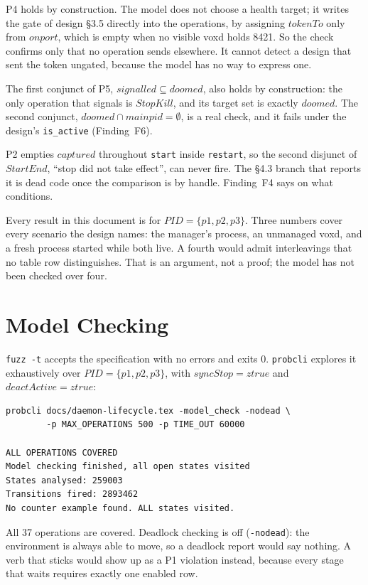 \documentclass[a4paper,10pt,fleqn]{article}
\begin{document}
P4 holds by construction. The model does not choose a health target; it
writes the gate of design \S3.5 directly into the operations, by assigning
$tokenTo$ only from $onport$, which is empty when no visible voxd holds
8421. So the check confirms only that no operation sends elsewhere. It
cannot detect a design that sent the token ungated, because the model has
no way to express one.

The first conjunct of P5, $signalled \subseteq doomed$, also holds by
construction: the only operation that signals is $StopKill$, and its target
set is exactly $doomed$. The second conjunct,
$doomed \cap mainpid = \emptyset$, is a real check, and it fails under the
design's \texttt{is\_active} (Finding~F6).

P2 empties $captured$ throughout \texttt{start} inside \texttt{restart}, so
the second disjunct of $StartEnd$, ``stop did not take effect'', can never
fire. The \S4.3 branch that reports it is dead code once the comparison is
by handle. Finding~F4 says on what conditions.

Every result in this document is for $PID = \{p1, p2, p3\}$. Three numbers
cover every scenario the design names: the manager's process, an unmanaged
voxd, and a fresh process started while both live. A fourth would admit
interleavings that no table row distinguishes. That is an argument, not a
proof; the model has not been checked over four.

\section{Model Checking}
\label{sec:modelcheck}

\texttt{fuzz -t} accepts the specification with no errors and exits 0.
\texttt{probcli} explores it exhaustively over $PID = \{p1, p2, p3\}$, with
$syncStop = ztrue$ and $deactActive = ztrue$:

\begin{verbatim}
probcli docs/daemon-lifecycle.tex -model_check -nodead \
        -p MAX_OPERATIONS 500 -p TIME_OUT 60000

ALL OPERATIONS COVERED
Model checking finished, all open states visited
States analysed: 259003
Transitions fired: 2893462
No counter example found. ALL states visited.
\end{verbatim}

All 37 operations are covered. Deadlock checking is off (\texttt{-nodead}):
the environment is always able to move, so a deadlock report would say
nothing. A verb that sticks would show up as a P1 violation instead, because
every stage that waits requires exactly one enabled row.
\end{document}
